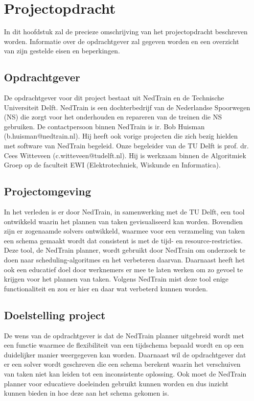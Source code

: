 \section{Projectopdracht}
In dit hoofdstuk zal de precieze omschrijving van het projectopdracht beschreven worden. Informatie over de opdrachtgever zal gegeven worden en een overzicht van zijn gestelde eisen en beperkingen.

\subsection{Opdrachtgever}
De opdrachtgever voor dit project bestaat uit NedTrain en de Technische Universiteit Delft.
NedTrain is een dochterbedrijf van de Nederlandse Spoorwegen (NS) die zorgt voor het onderhouden en repareren van de treinen die NS gebruiken. De contactpersoon binnen NedTrain is ir. Bob Huisman (b.huisman@nedtrain.nl). Hij heeft ook vorige projecten die zich bezig hielden met software van NedTrain begeleid. Onze begeleider van de TU Delft is prof. dr. Cees Witteveen (c.witteveen@tudelft.nl). Hij is werkzaam binnen de Algoritmiek Groep op de faculteit EWI (Elektrotechniek, Wiskunde en Informatica).

\subsection{Projectomgeving}
In het verleden is er door NedTrain, in samenwerking met de TU Delft, een tool ontwikkeld waarin het plannen van taken gevisualiseerd kan worden. Bovendien zijn er zogenaamde solvers ontwikkeld, waarmee voor een verzameling van taken een schema gemaakt wordt dat consistent is met de tijd- en resource-restricties. Deze tool, de NedTrain planner, wordt gebruikt door NedTrain om onderzoek te doen naar scheduling-algoritmes en het verbeteren daarvan. Daarnaast heeft het ook een educatief doel door werknemers er mee te laten werken om zo gevoel te krijgen voor het plannen van taken. Volgens NedTrain mist deze tool enige functionaliteit en zou er hier en daar wat verbeterd kunnen worden.

\subsection{Doelstelling project}
De wens van de opdrachtgever is dat de NedTrain planner uitgebreid wordt met een functie waarmee de flexibiliteit van een tijdschema bepaald wordt en op een duidelijker manier weergegeven kan worden. Daarnaast wil de opdrachtgever dat er een solver wordt geschreven die een schema berekent waarin het verschuiven van taken niet kan leiden tot een inconsistente oplossing. Ook moet de NedTrain planner voor educatieve doeleinden gebruikt kunnen worden en dus inzicht kunnen bieden in hoe deze aan het schema gekomen is.

